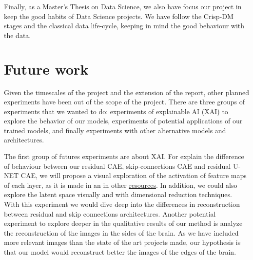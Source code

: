 Finally, as a Master's Thesis on Data Science, we also have focus our project in keep the good habits of Data Science projects. We have follow the Crisp-DM stages and the classical data life-cycle, keeping in mind the good behaviour with the data.


\section{Future work}

Given the timescales of the project and the extension of the report, other planned experiments have been out of the scope of the project. There are three groups of experiments that we wanted to do: experiments of explainable AI (XAI) to explore the behavior of our models, experiments of potential applications of our trained models, and finally experiments with other alternative models and architectures.

The first group of futures experiments are about XAI. For explain the difference of behaviour between our residual CAE, skip-connections CAE and residual U-NET CAE, we will propose a visual exploration of the activation of feature maps of each layer, as it is made in \cite{kernelsactivation} an in other \href{https://towardsdatascience.com/using-skip-connections-to-enhance-denoising-autoencoder-algorithms-849e049c0ac9}{resources}. In addition, we could also explore the latent space visually and with dimensional reduction techniques. With this experiment we would dive deep into the differences in reconstruction between residual and skip connections architectures. Another potential experiment to explore deeper in the qualitative results of our method is analyze the reconstruction of the images in the sides of the brain. As we have included more relevant images than the state of the art projects made, our hypothesis is that our model would reconstruct better the images of the edges of the brain.

